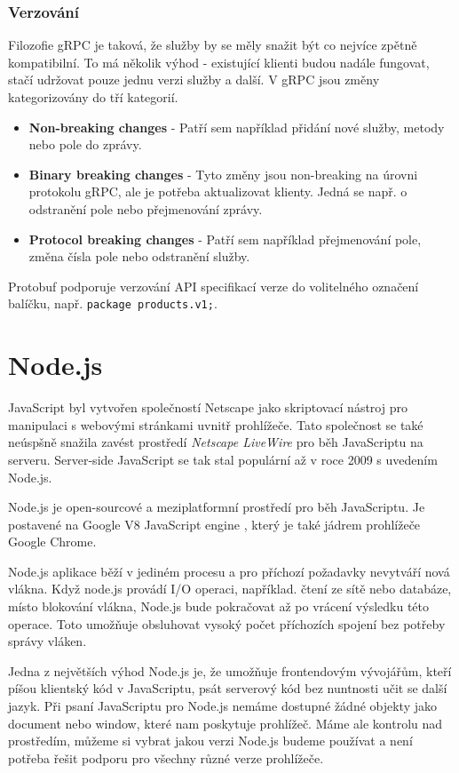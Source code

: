 \documentclass[thesis=M,czech]{FITthesis}[2019/12/23]
\begin{document}
\subsubsection*{Verzování}
Filozofie gRPC je taková, že služby by se měly snažit být co nejvíce zpětně kompatibilní. To má několik výhod - existující klienti budou nadále fungovat, stačí udržovat pouze jednu verzi služby a další. V gRPC jsou změny kategorizovány do tří kategorií.

\begin{itemize}
    \item \textbf{Non-breaking changes} - Patří sem například přidání nové služby, metody nebo pole do zprávy.
    \item \textbf{Binary breaking changes} - Tyto změny jsou non-breaking na úrovni protokolu gRPC, ale je potřeba aktualizovat klienty. Jedná se např. o odstranění pole nebo přejmenování zprávy.
    \item \textbf{Protocol breaking changes} - Patří sem například přejmenování pole, změna čísla pole nebo odstranění služby.
\end{itemize}

Protobuf podporuje verzování API specifikací verze do volitelného označení balíčku, např. \texttt{package products.v1;}. 

\section{Node.js }
JavaScript byl vytvořen společností Netscape jako skriptovací nástroj pro manipulaci s webovými stránkami uvnitř prohlížeče. Tato společnost se také neúspšně snažila zavést prostředí \textit{Netscape LiveWire} pro běh JavaScriptu na serveru. Server-side JavaScript se tak stal populární až v roce 2009 s uvedením Node.js.

Node.js \cite{node} je open-sourcové a meziplatformní prostředí pro běh JavaScriptu. Je postavené na Google V8 JavaScript engine \cite{v8}, který je také jádrem prohlížeče Google Chrome.

Node.js aplikace běží v jediném procesu a pro příchozí požadavky nevytváří nová vlákna. Když node.js provádí I/O operaci, například. čtení ze sítě nebo databáze, místo blokování vlákna, Node.js bude pokračovat až po vrácení výsledku této operace. Toto umožňuje obsluhovat vysoký počet příchozích spojení bez potřeby správy vláken.

Jedna z největších výhod Node.js je, že umožňuje frontendovým vývojářům, kteří píšou klientský kód v JavaScriptu, psát serverový kód bez nuntnosti učit se další jazyk. 
Při psaní JavaScriptu pro Node.js nemáme dostupné žádné objekty jako document nebo window, které nam poskytuje prohlížeč. Máme ale kontrolu nad prostředím, můžeme si vybrat jakou verzi Node.js budeme používat a není potřeba řešit podporu pro všechny různé verze prohlížeče.
\end{document}

